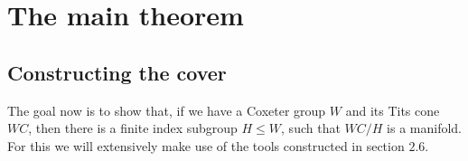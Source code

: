 \chapter{The main theorem}

\section{Constructing the cover}

The goal now is to show that, if we have a Coxeter group \(W\) and its Tits cone \(WC\), then there is a finite index subgroup \(H \leq W\), such that \(WC/H\) is a manifold.
For this we will extensively make use of the tools constructed in section \(2.6\).

